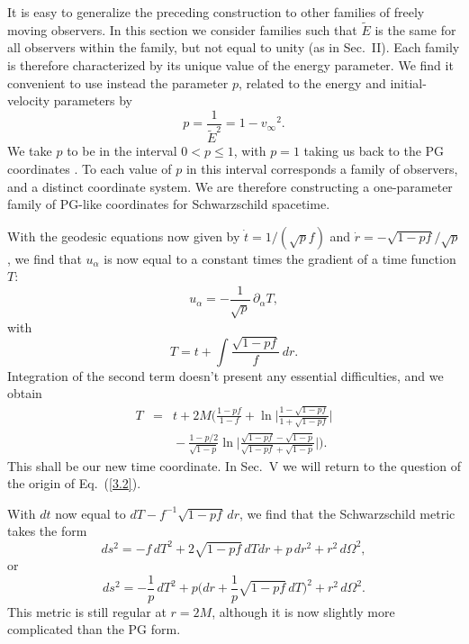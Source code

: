 It is easy to generalize the preceding construction to other families 
of freely moving observers. In this section we consider families such
that $\tilde{E}$ is the same for all observers within the family, but
not equal to unity (as in Sec.~II). Each family is therefore
characterized by its unique value of the energy parameter. We find it
convenient to use instead the parameter $p$, related to the energy and 
initial-velocity parameters by
\begin{equation}
p = \frac{1}{\tilde{E}^2} = 1 - {v_\infty}^2. 
\label{3.1}
\end{equation}
We take $p$ to be in the interval $0 < p \leq 1$, with $p=1$ taking us 
back to the PG coordinates \cite{f2}. To each value of $p$ in this
interval corresponds a family of observers, and a distinct coordinate 
system. We are therefore constructing a one-parameter family of
PG-like coordinates for Schwarzschild spacetime. 

With the geodesic equations now given by $\dot{t} = 1/(\sqrt{p} f)$
and $\dot{r} = -\sqrt{1-pf}/\sqrt{p}$, we find that $u_\alpha$ is now
equal to a constant times the gradient of a time function $T$:
\begin{equation}
u_\alpha = - \frac{1}{\sqrt{p}}\, \partial_\alpha T,
\label{3.2}
\end{equation}
with 
\begin{equation}
T = t + \int \frac{\sqrt{1-pf}}{f}\, dr. 
\label{3.3}
\end{equation}
Integration of the second term doesn't present any essential
difficulties, and we obtain
\begin{eqnarray}
T &=& t + 2M \biggl( \frac{1-pf}{1-f} 
+ \ln \biggl| \frac{1 - \sqrt{1-pf}}{1 + \sqrt{1-pf}} \biggr| 
\nonumber \\ & & \mbox{}  
- \frac{1-p/2}{\sqrt{1-p}} 
\ln \biggl| \frac{\sqrt{1-pf}
-\sqrt{1-p}}{\sqrt{1-pf}+\sqrt{1-p}} \biggr| \biggr).  
\label{3.4}
\end{eqnarray} 
This shall be our new time coordinate. In Sec.~V we will return to the
question of the origin of Eq.~(\ref{3.2}). 

With $dt$ now equal to $dT - f^{-1}\sqrt{1-pf}\, dr$, we find that the
Schwarzschild metric takes the form  
\begin{equation}
ds^2 = -f\, dT^2 + 2\sqrt{1-pf}\, dTdr + p\, dr^2 + r^2\, d\Omega^2, 
\label{3.5}
\end{equation}
or
\begin{equation}
ds^2 = -\frac{1}{p}\, dT^2 + p \biggl( dr 
+ \frac{1}{p} \sqrt{1-pf}\, dT \biggr)^2 + r^2\, d\Omega^2.
\label{3.6}
\end{equation}
This metric is still regular at $r=2M$, although it is now slightly
more complicated than the PG form.  

